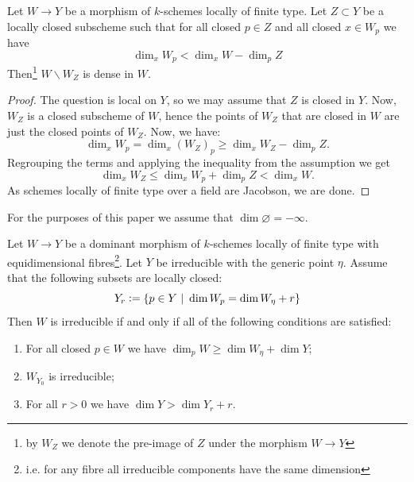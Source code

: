 \begin{corollary}\label{cor:irrelevant_fibres}
    Let  $W \to Y$ be a morphism of $k$-schemes locally of finite type. Let $Z \subset Y$ be a locally closed subscheme such that for all closed $p \in Z$ and all closed $x \in W_p$ we have
    \[
    \dim_x W_p < \dim_x W - \dim_p Z 
    \]
    Then\footnote{by $W_Z$ we denote the pre-image of $Z$ under the morphism $W\to Y$} $W \backslash W_Z$ is dense in $W$. 
\end{corollary}
\begin{proof}
    The question is local on $Y$, so we may assume that $Z$ is closed in $Y$. Now, $W_Z$ is a closed subscheme of $W$, hence the points of $W_Z$ that are closed in $W$ are just the closed points of $W_Z$. Now, we have:
    \[
    \dim_x W_p = \dim_x (W_Z)_p \ge \dim_x W_Z - \dim_p Z.
    \]
     Regrouping the terms and applying the inequality from the assumption we get
    \[
    \dim_x W_Z \le \dim_x W_p + \dim_p Z < \dim_x W.
    \]
    As schemes locally of finite type over a field are Jacobson, we are done.
\end{proof}
\begin{notation}
    For the purposes of this paper we assume that $\dim \varnothing = -\infty$.
\end{notation}
\begin{corollary}\label{cor:irreducibility_criterion}
    Let $W \to Y$ be a dominant morphism of $k$-schemes locally of finite type with equidimensional fibres\footnote{i.e. for any fibre all irreducible components have the same dimension}. Let $Y$ be irreducible with the generic point $\eta$. Assume that the following subsets are locally closed:
    \[
    Y_r \vcentcolon= \{ p \in Y\ |\ \dim W_p = \dim W_\eta + r \}
    \]
    Then $W$ is irreducible if and only if all of the following conditions are satisfied:
    \begin{enumerate}
        \item For all closed $p \in W$ we have $\dim_p W \ge \dim W_\eta + \dim Y$;
        \item $W_{Y_0}$ is irreducible;
        \item For all $r > 0$ we have $\dim Y > \dim Y_r + r$.
    \end{enumerate}
\end{corollary}
